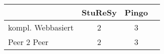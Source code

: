  \begin{tabular}{|l|c|c|c|}
  & StuReSy & Pingo  \\
  \hline
  kompl. Webbasiert & 2 & 3 \\
  Peer 2 Peer & 2 & 3 \\
 \end{tabular}